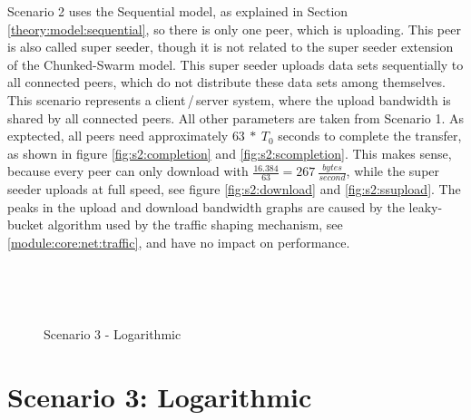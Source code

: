 Scenario 2 uses the Sequential model, as explained in Section \ref{theory:model:sequential}, so there is only one peer, which is uploading. This peer is also called super seeder, though it is not related to the super seeder extension of the Chunked-Swarm model. This super seeder uploads data sets sequentially to all connected peers, which do not distribute these data sets among themselves. This scenario represents a client\,/\,server system, where the upload bandwidth is shared by all connected peers. All other parameters are taken from Scenario 1. As exptected, all peers need approximately $63\:*\:T_0$ seconds to complete the transfer, as shown in figure \ref{fig:s2:completion} and \ref{fig:s2:scompletion}. This makes sense, because every peer can only download with $\frac{16.384}{63}=267\:\frac{bytes}{second}$, while the super seeder uploads at full speed, see figure \ref{fig:s2:download} and \ref{fig:s2:ssupload}. The peaks in the upload and download bandwidth graphs are caused by the leaky-bucket algorithm used by the traffic shaping mechanism, see \ref{module:core:net:traffic}, and have no impact on performance.




\begin{figure}[!ht]
	\begin{center}	
		~ %

	 	~ %

		\caption{Scenario 3 - Logarithmic}
		\label{fig:s3}
	\end{center}
\end{figure}

\pagebreak
\section{Scenario 3: Logarithmic}
\label{evaluation:3}

